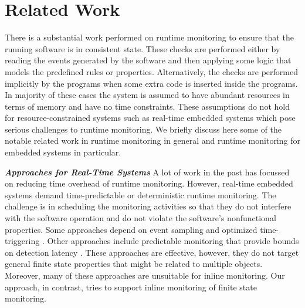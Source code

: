 \section{Related Work}

There is a substantial work performed on runtime monitoring to ensure that the 
running software is in consistent state. These checks are performed either by 
reading the events generated by the software and then applying some logic that 
models the predefined rules or properties. Alternatively, the checks are 
performed implicitly by the programs when some extra code is inserted inside the 
programs. In majority of these cases the system is assumed to have abundant 
resources in terms of memory and have no time constraints. These assumptions do 
not hold for resource-constrained systems such as real-time embedded systems 
which pose serious challenges to runtime monitoring. We briefly discuss here 
some of the notable related work in runtime monitoring in general and runtime 
monitoring for embedded systems in particular.

\textbf{\textit {Approaches for Real-Time Systems}} A lot of work in the past 
has focussed on reducing time overhead of runtime monitoring. However, real-time 
embedded systems demand time-predictable or deterministic runtime monitoring. 
The challenge is in scheduling the monitoring activities so that they do not 
interfere with the software operation and do not violate the software's 
nonfunctional properties. Some approaches depend on event sampling and optimized 
time-triggering \cite{ArafaKF13, NavabpourBF12, WuKBF13}. Other approaches 
include predictable monitoring that provide bounds on detection latency 
\cite{ZhuDG09, ZhuGD10}. These approaches are effective, however, they do not 
target general finite state properties that might be related to multiple 
objects. Moreover, many of these approaches are unsuitable for inline 
monitoring. Our approach, in contrast, tries to support inline monitoring of 
finite state monitoring.

